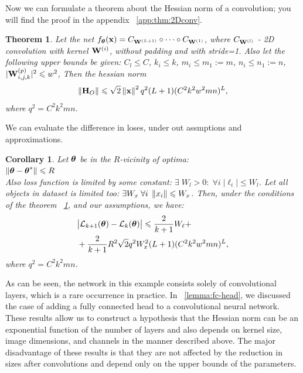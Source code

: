 \documentclass[conference]{IEEEtran}
\newtheorem{theorem}{Theorem}
\newtheorem{corollary}{Corollary}
\begin{document}
Now we can formulate a theorem about the Hessian norm of a convolution; you will find the proof in the appendix ~\ref{app:thm:2Dconv}.
\begin{theorem}\label{thm:2Dconv}
    Let the net $f_{\boldsymbol{\theta}}(\mathbf{x}) = C_{\mathbf{W}^{(L+1)}} \circ \dots \circ C_{\mathbf{W}^{(1)}}$, where $C_{\mathbf{W}^{(l)}}$ - 2D convolution with kernel $\mathbf{W}^{(i)}$, without padding and with stride=1. Also let the following upper bounds be given:
     $C_l \leqslant C$,
     $k_i \leqslant k$,
     $m_i \leqslant m_1:=m$, $n_i \leqslant n_1:=n$,
     $|\mathbf{W}^{(p)}_{i,j,k}|^2 \leqslant w^2$,
    Then the hessian norm \\
    \[\left\|\mathbf{H}_{O}\right\| \leqslant \sqrt{2}\left\|\mathbf{x}\right\|^2q^2(L+1)(C^2k^2w^2mn)^{L},\] 
    where $q^2 = C^2k^2mn$.
\end{theorem}
We can evaluate the difference in loses, under out assmptions and approximations.
\begin{corollary}
Let $\boldsymbol{\theta}$ be in the $R$-vicinity of optima: \\
$\left\|\boldsymbol{\theta} - \boldsymbol{\theta}^*\right\| \leqslant R$ \\
Also loss function is limited by some constant: $\exists \; W_l > 0: \; \forall i\; |\ell_i| \leqslant W_l$.
Let all objects in dataset is limited too: $\exists W_x\; \forall i \; \left\|x_i\right\| \leqslant W_x$. Then, under the conditions of the theorem ~\ref{thm:2Dconv}, and our assumptions, we have:
\begin{align*}
& \big|\mathcal{L}_{k+1}(\boldsymbol{\theta}) - \mathcal{L}_{k}(\boldsymbol{\theta})\big| \leqslant \frac{2}{k+1}W_{\ell} +\\
& + \frac{2}{k+1}R^2\sqrt{2}q^2W_{x}^2(L+1)(C^2k^2w^2mn)^L,
\end{align*}
where $q^2 = C^2k^2mn$.
\end{corollary}
As can be seen, the network in this example consists solely of convolutional layers, which is a rare occurrence in practice. In ~\ref{lemma:fc-head}, we discussed the case of adding a fully connected head to a convolutional neural network.
These results allow us to construct a hypothesis that the Hessian norm can be an exponential function of the number of layers and also depends on kernel size, image dimensions, and channels in the manner described above. The major disadvantage of these results is that they are not affected by the reduction in sizes after convolutions and depend only on the upper bounds of the parameters. 
\end{document}
